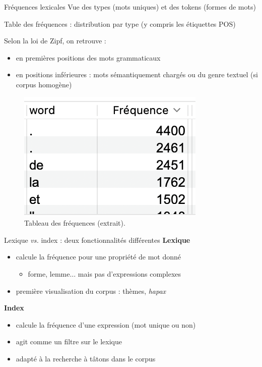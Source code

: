 \documentclass[xetex,xcolor={table,usenames,dvipsnames}]{beamer}
\newcommand{\bolder}[1]{{\color{purple}\bfseries#1}}
\begin{document}
\begin{frame}{Fréquences lexicales}
	Vue des types (mots uniques) et des tokens (formes de mots)
	
	Table des fréquences : distribution par type (y compris les étiquettes \textsc{POS})
	
	Selon la loi de Zipf, on retrouve :
	\begin{itemize}
		\item en premières positions des mots grammaticaux
		\item en positions inférieures : mots sémantiquement chargés ou du genre textuel (si corpus homogène)
	\end{itemize}

	\begin{figure}[h] %
		\centering
		\includegraphics[width=0.25\linewidth]{img/frequences.png}
		\caption{Tableau des fréquences (extrait).}
		\label{fig:ling_out_TAL}
	\end{figure}
\end{frame}

\begin{frame}{Lexique \textit{vs.} index : deux fonctionnalités différentes}
	\bolder{Lexique}
	\begin{itemize}
		\item calcule la fréquence pour une propriété de mot donné
		\begin{itemize}
		 \item forme, lemme$\dots$ mais pas d'expressions complexes
		\end{itemize}
		\item première visualisation du corpus : thèmes, \textit{hapax}
	\end{itemize}
	\bolder{Index}
	\begin{itemize}
		\item calcule la fréquence d'une expression (mot unique ou non)
		\item agit comme un filtre sur le lexique
		\item adapté à la recherche à tâtons dans le corpus
	\end{itemize}
\end{frame}
\end{document}
